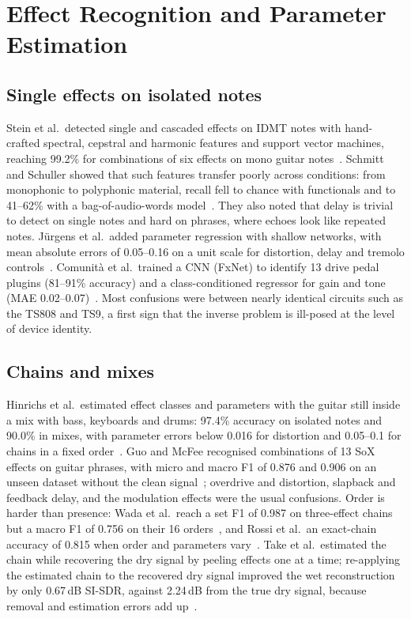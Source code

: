\section{Effect Recognition and Parameter Estimation}
\label{sec:recognition}

\subsection{Single effects on isolated notes}

Stein et al.\ detected single and cascaded effects on IDMT notes with
hand-crafted spectral, cepstral and harmonic features and support vector
machines, reaching 99.2\% for combinations of six effects on mono guitar
notes~\cite{stein2010aes,stein2010dafx}. Schmitt and Schuller showed that such
features transfer poorly across conditions: from monophonic to polyphonic
material, recall fell to chance with functionals and to 41--62\% with a
bag-of-audio-words model~\cite{schmitt2017recognising}. They also noted that
delay is trivial to detect on single notes and hard on phrases, where echoes
look like repeated notes. Jürgens et al.\ added parameter regression with
shallow networks, with mean absolute errors of 0.05--0.16 on a unit scale for
distortion, delay and tremolo controls~\cite{jurgens2020recognizing}.
Comunità et al.\ trained a CNN (FxNet) to identify 13 drive pedal plugins
(81--91\% accuracy) and a class-conditioned regressor for gain and tone (MAE
0.02--0.07)~\cite{comunita2021guitar}. Most confusions were between nearly
identical circuits such as the TS808 and TS9, a first sign that the inverse
problem is ill-posed at the level of device identity.

\subsection{Chains and mixes}

Hinrichs et al.\ estimated effect classes and parameters with the guitar
still inside a mix with bass, keyboards and drums: 97.4\% accuracy on isolated
notes and 90.0\% in mixes, with parameter errors below 0.016 for distortion
and 0.05--0.1 for chains in a fixed order~\cite{hinrichs2022convolutional}.
Guo and McFee recognised combinations of 13 SoX effects on guitar phrases,
with micro and macro F1 of 0.876 and 0.906 on an unseen dataset without the
clean signal~\cite{guo2023automatic}; overdrive and distortion, slapback and
feedback delay, and the modulation effects were the usual confusions. Order is
harder than presence: Wada et al.\ reach a set F1 of 0.987 on three-effect
chains but a macro F1 of 0.756 on their 16 orders~\cite{wada2025hyperbolic},
and Rossi et al.\ an exact-chain accuracy of 0.815 when order and parameters
vary~\cite{rossi2025automatic}. Take et al.\ estimated the chain while
recovering the dry signal by peeling effects one at a time; re-applying the
estimated chain to the recovered dry signal improved the wet reconstruction by
only 0.67\,dB SI-SDR, against 2.24\,dB from the true dry signal, because
removal and estimation errors add up~\cite{take2024audio}.

